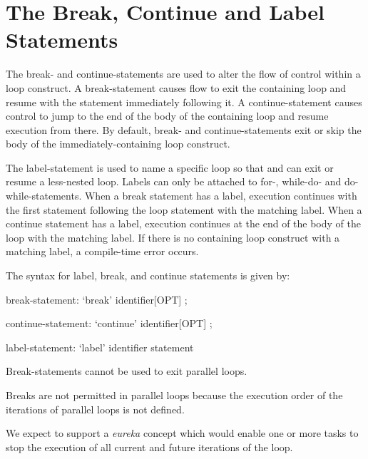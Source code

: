 \section{The Break, Continue and Label Statements}
\label{Label_Break_Continue}

The break- and continue-statements are used to alter the flow of control within a
loop construct.  A break-statement causes flow to exit the containing loop and
resume with the statement immediately following it.  A continue-statement causes
control to jump to the end of the body of the containing loop and resume
execution from there.  By default, break- and continue-statements exit
or skip the body of the immediately-containing loop construct.

The label-statement is used to name a specific loop so that 
and  can exit or resume a less-nested loop.
Labels can only be attached to for-, while-do- and do-while-statements.
When a break statement has a label, execution continues with the first statement
following the loop statement with the matching label.  When a continue statement
has a label, execution continues at the end of the body of the loop with the
matching label.  If there is no containing loop construct with a matching label,
a compile-time error occurs.

The syntax for label, break, and continue statements is given by:
\begin{syntax}
break-statement:
  `break' identifier[OPT] ;

continue-statement:
  `continue' identifier[OPT] ;

label-statement:
  `label' identifier statement
\end{syntax}

Break-statements cannot be used to exit parallel loops.  

\begin{rationale}
Breaks are not permitted in parallel loops because the execution order
of the iterations of parallel loops is not defined.
\end{rationale}

\begin{future}
We expect to support a \emph{eureka} concept which would enable one or
more tasks to stop the execution of all current and future iterations
of the loop.
\end{future}

